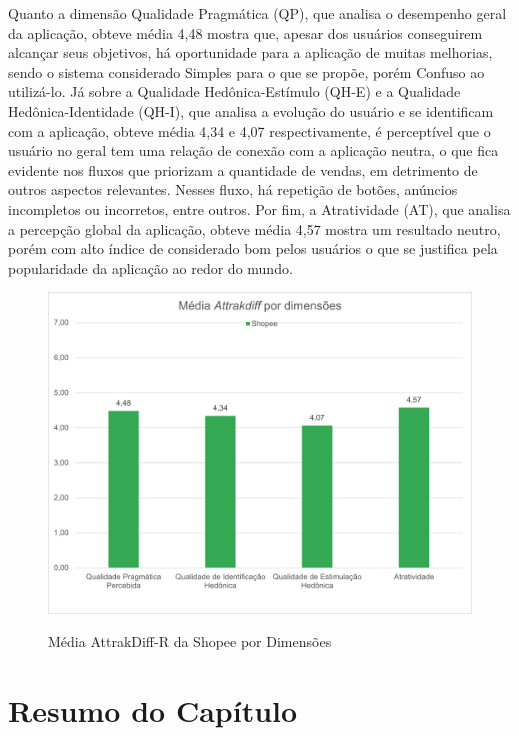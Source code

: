 Quanto a dimensão Qualidade Pragmática (QP), que analisa o desempenho geral da aplicação, obteve média 4,48 mostra que, apesar dos usuários conseguirem alcançar seus objetivos, há oportunidade para a aplicação de muitas melhorias, sendo o sistema considerado Simples para o que se propõe, porém Confuso ao utilizá-lo. Já sobre a Qualidade Hedônica-Estímulo (QH-E) e a Qualidade Hedônica-Identidade (QH-I), que analisa a evolução do usuário e se identificam com a aplicação, obteve média 4,34 e 4,07 respectivamente, é perceptível que o usuário no geral tem uma relação de conexão com a aplicação neutra, o que fica evidente nos fluxos que priorizam a quantidade de vendas, em detrimento de outros aspectos relevantes. Nesses fluxo, há repetição de botões, anúncios incompletos ou incorretos, entre outros. Por fim, a Atratividade (AT), que analisa a percepção global da aplicação, obteve média 4,57 mostra um resultado neutro, porém com alto índice de considerado bom pelos usuários o que se justifica pela popularidade da aplicação ao redor do mundo.

\begin{figure}[ht]
    \centering
    \caption{Média AttrakDiff-R da Shopee por Dimensões}
    \includegraphics[keepaspectratio=true,scale=0.6]{figuras/Media_Attrakdiff_dim_7_shopee.png}
    \label{ShopeeDimencoes}
\end{figure}


\section{Resumo do Capítulo}
    \label{ResumoProposta}

